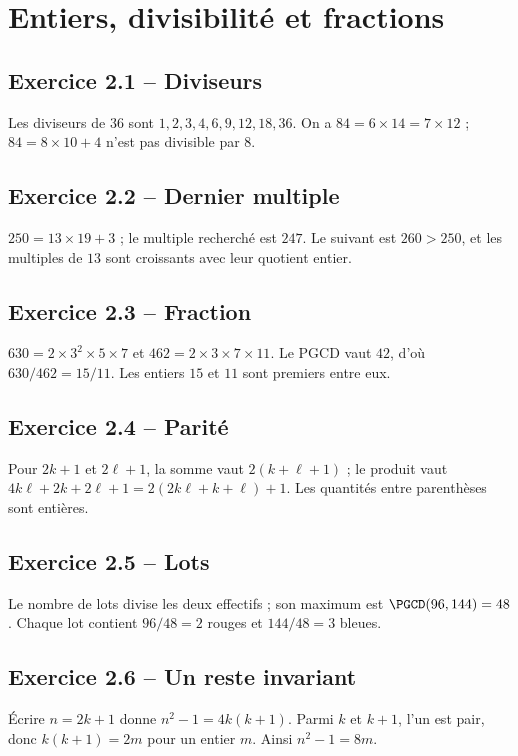 \chapter{Entiers, divisibilité et fractions}
\section*{Exercice 2.1 -- Diviseurs}
Les diviseurs de $36$ sont $1,2,3,4,6,9,12,18,36$. On a $84=6\times14=7\times12$ ; $84=8\times10+4$ n'est pas divisible par $8$.

\section*{Exercice 2.2 -- Dernier multiple}
$250=13\times19+3$ ; le multiple recherché est $247$. Le suivant est $260>250$, et les multiples de $13$ sont croissants avec leur quotient entier.

\section*{Exercice 2.3 -- Fraction}
$630=2\times3^2\times5\times7$ et $462=2\times3\times7\times11$. Le PGCD vaut $42$, d'où $630/462=15/11$. Les entiers $15$ et $11$ sont premiers entre eux.

\section*{Exercice 2.4 -- Parité}
Pour $2k+1$ et $2\ell+1$, la somme vaut $2(k+\ell+1)$ ; le produit vaut $4k\ell+2k+2\ell+1=2(2k\ell+k+\ell)+1$. Les quantités entre parenthèses sont entières.

\section*{Exercice 2.5 -- Lots}
Le nombre de lots divise les deux effectifs ; son maximum est $\PGCD(96,144)=48$. Chaque lot contient $96/48=2$ rouges et $144/48=3$ bleues.

\section*{Exercice 2.6 -- Un reste invariant}
Écrire $n=2k+1$ donne $n^2-1=4k(k+1)$. Parmi $k$ et $k+1$, l'un est pair, donc $k(k+1)=2m$ pour un entier $m$. Ainsi $n^2-1=8m$.
